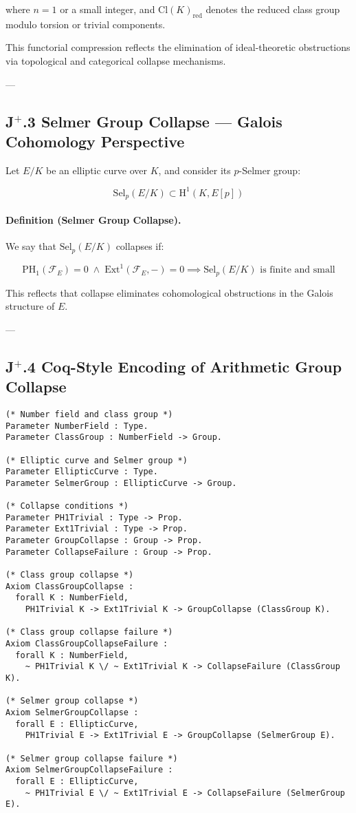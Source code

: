 \documentclass[11pt]{article}
\begin{document}
where \( n = 1 \) or a small integer, and \( \mathrm{Cl}(K)_{\mathrm{red}} \) denotes the reduced class group modulo torsion or trivial components.

This functorial compression reflects the elimination of ideal-theoretic obstructions via topological and categorical collapse mechanisms.

---

\subsection*{J$^{+}$.3 Selmer Group Collapse — Galois Cohomology Perspective}

Let $E/K$ be an elliptic curve over $K$, and consider its $p$-Selmer group:

\[
\mathrm{Sel}_p(E/K) \subset \mathrm{H}^1(K, E[p])
\]

\paragraph{Definition (Selmer Group Collapse).}

We say that $\mathrm{Sel}_p(E/K)$ collapses if:

\[
\mathrm{PH}_1(\mathcal{F}_E) = 0 \;\land\; \mathrm{Ext}^1(\mathcal{F}_E, -) = 0 \implies \mathrm{Sel}_p(E/K) \text{ is finite and small}
\]

This reflects that collapse eliminates cohomological obstructions in the Galois structure of $E$.

---

\subsection*{J$^{+}$.4 Coq-Style Encoding of Arithmetic Group Collapse}

\begin{lstlisting}[language=Coq]
(* Number field and class group *)
Parameter NumberField : Type.
Parameter ClassGroup : NumberField -> Group.

(* Elliptic curve and Selmer group *)
Parameter EllipticCurve : Type.
Parameter SelmerGroup : EllipticCurve -> Group.

(* Collapse conditions *)
Parameter PH1Trivial : Type -> Prop.
Parameter Ext1Trivial : Type -> Prop.
Parameter GroupCollapse : Group -> Prop.
Parameter CollapseFailure : Group -> Prop.

(* Class group collapse *)
Axiom ClassGroupCollapse :
  forall K : NumberField,
    PH1Trivial K -> Ext1Trivial K -> GroupCollapse (ClassGroup K).

(* Class group collapse failure *)
Axiom ClassGroupCollapseFailure :
  forall K : NumberField,
    ~ PH1Trivial K \/ ~ Ext1Trivial K -> CollapseFailure (ClassGroup K).

(* Selmer group collapse *)
Axiom SelmerGroupCollapse :
  forall E : EllipticCurve,
    PH1Trivial E -> Ext1Trivial E -> GroupCollapse (SelmerGroup E).

(* Selmer group collapse failure *)
Axiom SelmerGroupCollapseFailure :
  forall E : EllipticCurve,
    ~ PH1Trivial E \/ ~ Ext1Trivial E -> CollapseFailure (SelmerGroup E).
\end{lstlisting}
\end{document}
